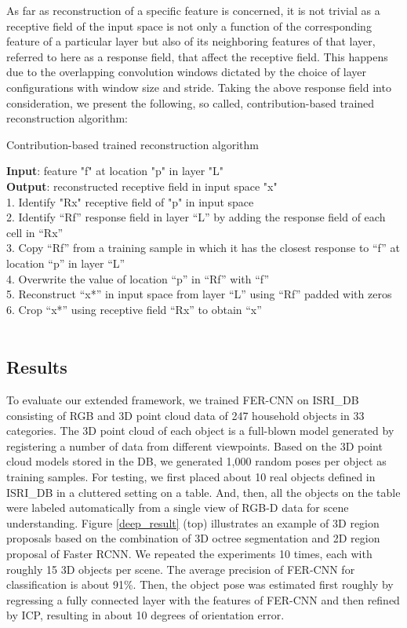 \documentclass{ieeeaccess}
\begin{document}
As far as reconstruction of a specific feature is concerned,
it is not trivial as a receptive field of the input space is not only
a function of the corresponding feature of a particular layer but
also of its neighboring features of that layer, referred to here as
a response field, that affect the receptive field. This happens due to the overlapping convolution
windows dictated by the choice of layer configurations with
window size and stride. Taking the above response field into
consideration, we present the following, so called,
contribution-based trained reconstruction algorithm:

\begin{algorithm}
\caption{Contribution-based trained reconstruction algorithm}
\SetAlgoLined
\textbf{Input}: feature "f" at location "p" in layer "L" \\
\textbf{Output}: reconstructed receptive field in input space "x" \\
1. Identify "Rx" receptive field of "p" in input space \\
2. Identify “Rf” response field in layer “L” by adding the
response field of each cell in “Rx” \\
3. Copy “Rf” from a training sample in which it has the
closest response to “f” at location “p” in layer “L” \\
4. Overwrite the value of location “p” in “Rf” with “f” \\
5. Reconstruct “x*” in input space from layer “L” using “Rf” padded with zeros \\
6. Crop “x*” using receptive field “Rx” to obtain “x” \\ \ \\
\end{algorithm}

\subsection{Results}
To evaluate our extended framework, we trained
FER-CNN on ISRI\_DB consisting of RGB and 3D point
cloud data of 247 household objects in 33 categories. The 3D
point cloud of each object is a full-blown model generated by
registering a number of data from different viewpoints. Based
on the 3D point cloud models stored in the DB, we generated
1,000 random poses per object as training samples. For
testing, we first placed about 10 real objects defined in
ISRI\_DB in a cluttered setting on a table. And, then, all the
objects on the table were labeled automatically from a single
view of RGB-D data for scene understanding. Figure \ref{deep_result} (top)
illustrates an example of 3D region proposals based on the
combination of 3D octree segmentation and 2D region
proposal of Faster RCNN. 
We repeated the experiments 10 times, each with roughly 15
3D objects per scene. The average precision of FER-CNN for
classification is about 91\%. Then, the object pose was
estimated first roughly by regressing a fully connected layer
with the features of FER-CNN and then refined by ICP,
resulting in about 10 degrees of orientation error.
\end{document}
